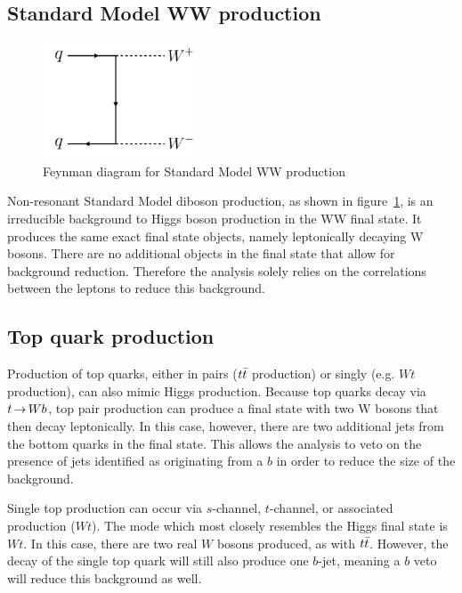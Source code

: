 \subsection{Standard Model WW production}

\begin{figure}[h!]
  \centering
  \captionsetup{justification=centering}

  \includegraphics[width=0.4\textwidth]{figures/Feyn_SMWW}
  \caption{Feynman diagram for Standard Model WW production}
  \label{fig:SMWWdiagram}
\end{figure}

Non-resonant Standard Model diboson production, as shown in figure~\ref{fig:SMWWdiagram}, is an irreducible background to Higgs boson production in the WW final state. It produces the same exact final state objects, namely leptonically decaying W bosons. There are no additional objects in the final state that allow for background reduction. Therefore the analysis solely relies on the correlations between the leptons to reduce this background. 

\subsection{Top quark production}

Production of top quarks, either in pairs ($t\bar{t}$ production) or singly (e.g. $Wt$ production), can also mimic Higgs production. Because top quarks decay via $t\,{\rightarrow}\, Wb$, top pair production can  produce a final state with two W bosons that then decay leptonically. In this case, however, there are two additional jets from the bottom quarks in the final state. This allows the analysis to veto on the presence of jets identified as originating from a $b$ in order to reduce the size of the background. 

Single top production can occur via $s$-channel, $t$-channel, or associated production ($Wt$). The mode which most closely resembles the Higgs final state is $Wt$. In this case, there are two real $W$ bosons produced, as with $t\bar{t}$. However, the decay of the single top quark will still also produce one $b$-jet, meaning a $b$ veto will reduce this background as well. 

